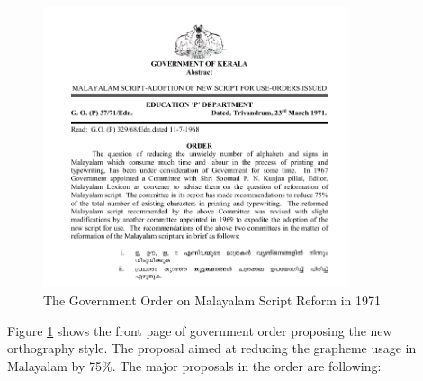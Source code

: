 \documentclass[10pt]{article}
\begin{document}
\begin{figure}[h!]
	\centering
	\includegraphics[width=0.8\textwidth]{images/1971-gov-script-reformation-order.png}
	\caption{The Government Order on Malayalam Script Reform in 1971}
	\label{go1971}
\end{figure}

Figure \ref{go1971} shows the front page of government order proposing the new orthography style. The proposal aimed at reducing the grapheme usage in Malayalam by 75\%. The major proposals in the order are following: \cite{1971go}
\end{document}
